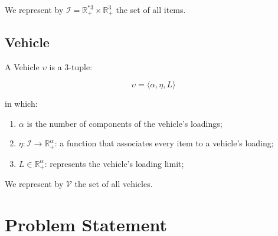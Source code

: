 \documentclass{article}
\newcommand{\realpositive}{\ensuremath{\mathbb{R}_{+}^{*}}\xspace}
\newcommand{\nrealnonnegative}[1]{\ensuremath{\mathbb{R}_{+}^{#1}}\xspace}
\newcommand{\nrealpositive}[1]{\ensuremath{\mathbb{R}_{+}^{*#1}}\xspace}
\newcommand{\tuple}[1]{#1-tuple\xspace}
\newcommand{\OrderedSet}[1]{\ensuremath{\langle#1\rangle}\xspace}
\newcommand{\function}[3]{\ensuremath{#1: #2 \rightarrow #3}\xspace}
\newcommand{\vehicleO}{\ensuremath{\upsilon}\xspace}
\newcommand{\vehicleSet}{\mathcal{V}\xspace}
\newcommand{\loadingFunction}{\ensuremath{\eta}\xspace}
\newcommand{\loadingLimit}{\ensuremath{L}\xspace}
\newcommand{\nAxles}{\ensuremath{\alpha}\xspace}
\newcommand{\loadingCodomain}{\nrealnonnegative{\nAxles}}
\newcommand{\itemSet}{\ensuremath{\mathcal{I}}\xspace}
\newcommand{\itemDomain}{\ensuremath{\nrealpositive{3} \times \nrealnonnegative{3}}\xspace}
\newcommand{\containero}{\ensuremath{c}\xspace}
\newcommand{\lx}{\ensuremath{\chi}\xspace}
\newcommand{\ly}{\ensuremath{\psi}\xspace}
\newcommand{\lz}{\ensuremath{\omega}\xspace}
\newcommand{\px}{\ensuremath{x}\xspace}
\newcommand{\py}{\ensuremath{y}\xspace}
\newcommand{\pz}{\ensuremath{z}\xspace}
\begin{document}
We represent by $\itemSet = \itemDomain$ the set of all items.

%
%
%
%

\subsection{Vehicle}

A Vehicle \vehicleO is a \tuple{3}:

\begin{equation}
	\label{definition:vehicle}
	\vehicleO = \OrderedSet{
		\nAxles,
		\loadingFunction,
		\loadingLimit
	}
\end{equation}

in which:

\begin{enumerate}
	\item $\nAxles$ is the number of components of the vehicle's loadings;
	\item $\function{\loadingFunction}{\itemSet}{\loadingCodomain}$: a function that associates every item to a vehicle's loading;
	\item $\loadingLimit \in \loadingCodomain$: represents the vehicle's loading limit;
\end{enumerate}

We represent by $\vehicleSet$ the set of all vehicles.

\section{Problem Statement}
\end{document}
